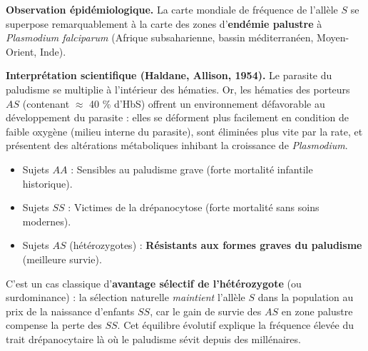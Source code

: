 \documentclass[11pt]{article}
\begin{document}
\textbf{Observation épidémiologique.} La carte mondiale de fréquence de l'allèle $S$ se superpose remarquablement à la carte des zones d'\textbf{endémie palustre} à \emph{Plasmodium falciparum} (Afrique subsaharienne, bassin méditerranéen, Moyen-Orient, Inde).

\textbf{Interprétation scientifique (Haldane, Allison, 1954).} Le parasite du paludisme se multiplie à l'intérieur des hématies. Or, les hématies des porteurs $AS$ (contenant $\approx$ 40 \% d'HbS) offrent un environnement défavorable au développement du parasite : elles se déforment plus facilement en condition de faible oxygène (milieu interne du parasite), sont éliminées plus vite par la rate, et présentent des altérations métaboliques inhibant la croissance de \emph{Plasmodium}.
\begin{itemize}
\item Sujets $AA$ : Sensibles au paludisme grave (forte mortalité infantile historique).
\item Sujets $SS$ : Victimes de la drépanocytose (forte mortalité sans soins modernes).
\item Sujets $AS$ (hétérozygotes) : \textbf{Résistants aux formes graves du paludisme} (meilleure survie).
\end{itemize}
C'est un cas classique d'\textbf{avantage sélectif de l'hétérozygote} (ou surdominance) : la sélection naturelle \emph{maintient} l'allèle $S$ dans la population au prix de la naissance d'enfants $SS$, car le gain de survie des $AS$ en zone palustre compense la perte des $SS$. Cet équilibre évolutif explique la fréquence élevée du trait drépanocytaire là où le paludisme sévit depuis des millénaires.
\end{document}
